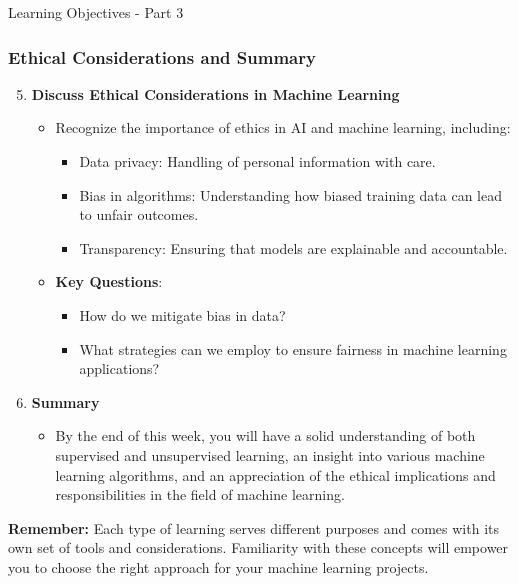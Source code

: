 \documentclass[aspectratio=169]{beamer}
\begin{document}
\begin{frame}[fragile]{Learning Objectives - Part 3}
    \frametitle{Ethical Considerations and Summary}
    \begin{enumerate}
        \setcounter{enumi}{4}
        \item \textbf{Discuss Ethical Considerations in Machine Learning}
        \begin{itemize}
            \item Recognize the importance of ethics in AI and machine learning, including:
            \begin{itemize}
                \item Data privacy: Handling of personal information with care.
                \item Bias in algorithms: Understanding how biased training data can lead to unfair outcomes.
                \item Transparency: Ensuring that models are explainable and accountable.
            \end{itemize}
            \item \textbf{Key Questions}:
            \begin{itemize}
                \item How do we mitigate bias in data?
                \item What strategies can we employ to ensure fairness in machine learning applications?
            \end{itemize}
        \end{itemize}
        
        \item \textbf{Summary}
        \begin{itemize}
            \item By the end of this week, you will have a solid understanding of both supervised and unsupervised learning, an insight into various machine learning algorithms, and an appreciation of the ethical implications and responsibilities in the field of machine learning.
        \end{itemize}
    \end{enumerate}
    
    \textbf{Remember:} Each type of learning serves different purposes and comes with its own set of tools and considerations. Familiarity with these concepts will empower you to choose the right approach for your machine learning projects.
\end{frame}
\end{document}
